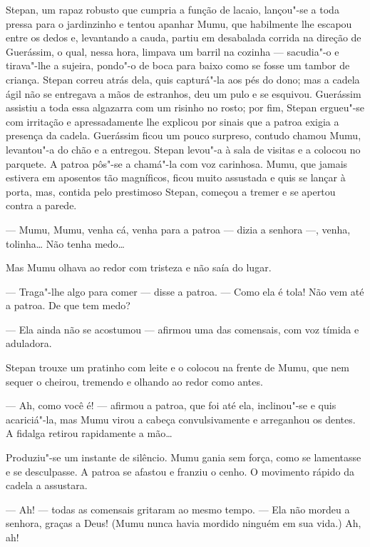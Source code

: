 Stepan, um rapaz robusto que cumpria a função de lacaio, lançou"-se a
toda pressa para o jardinzinho e tentou apanhar Mumu, que habilmente lhe
escapou entre os dedos e, levantando a cauda, partiu em desabalada
corrida na direção de Guerássim, o qual, nessa hora, limpava um barril
na cozinha --- sacudia"-o e tirava"-lhe a sujeira, pondo"-o de boca para
baixo como se fosse um tambor de criança. Stepan correu atrás dela, quis
capturá"-la aos pés do dono; mas a cadela ágil não se entregava a mãos de
estranhos, deu um pulo e se esquivou. Guerássim assistiu a toda essa
algazarra com um risinho no rosto; por fim, Stepan ergueu"-se com
irritação e apressadamente lhe explicou por sinais que a patroa exigia a
presença da cadela. Guerássim ficou um pouco surpreso, contudo chamou
Mumu, levantou"-a do chão e a entregou. Stepan levou"-a à sala de visitas
e a colocou no parquete. A patroa pôs"-se a chamá"-la com voz carinhosa.
Mumu, que jamais estivera em aposentos tão magníficos, ficou muito
assustada e quis se lançar à porta, mas, contida pelo prestimoso Stepan,
começou a tremer e se apertou contra a parede.

--- Mumu, Mumu, venha cá, venha para a patroa --- dizia a senhora ---,
venha, tolinha\ldots{} Não tenha medo\ldots{}


Mas Mumu olhava ao redor com tristeza e não saía do lugar.

--- Traga"-lhe algo para comer --- disse a patroa. --- Como ela é tola!
Não vem até a patroa. De que tem medo?

--- Ela ainda não se acostumou --- afirmou uma das comensais, com voz
tímida e aduladora.

Stepan trouxe um pratinho com leite e o colocou na frente de Mumu, que
nem sequer o cheirou, tremendo e olhando ao redor como antes.

--- Ah, como você é! --- afirmou a patroa, que foi até ela, inclinou"-se
e quis acariciá"-la, mas Mumu virou a cabeça convulsivamente e arreganhou
os dentes. A fidalga retirou rapidamente a mão\ldots{}

Produziu"-se um instante de silêncio. Mumu gania sem força, como se
lamentasse e se desculpasse. A patroa se afastou e franziu o cenho. O
movimento rápido da cadela a assustara.

--- Ah! --- todas as comensais gritaram ao mesmo tempo. --- Ela não
mordeu a senhora, graças a Deus! (Mumu nunca havia mordido ninguém em
sua vida.) Ah, ah!

